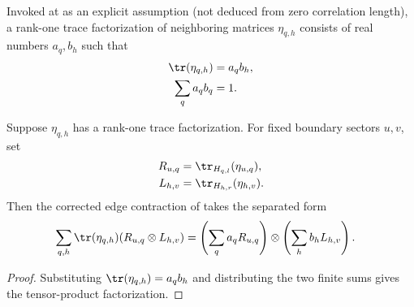 \begin{definition}
    \label{def:mpdo_generic_eta_rank_one_trace_factorization}
    \leanok
    Invoked at \cite[Appendix~C.2, line~1613]{Cirac2016MPDO_arXiv} as an
    explicit assumption (not deduced from zero correlation length), a
    rank-one trace factorization of neighboring matrices $\eta_{q,h}$
    consists of real numbers $a_q,b_h$ such that
    \begin{align}
        \tr(\eta_{q,h}) & =a_qb_h,
        \notag                     \\
        \sum_q a_qb_q   & =1.
        \notag
    \end{align}
\end{definition}

\begin{lemma}
    \label{lem:mpdo_eta_two_boundary_contraction_separated}
    \leanok
    Suppose $\eta_{q,h}$ has a rank-one trace factorization. For fixed
    boundary sectors $u,v$, set
    \begin{align}
        R_{u,q} & =\tr_{H_{q,l}}(\eta_{u,q}),
        \notag                                \\
        L_{h,v} & =\tr_{H_{h,r}}(\eta_{h,v}).
        \notag
    \end{align}
    Then the corrected edge contraction of
    \cite[Appendix~C.2, lines~1613--1617]{Cirac2016MPDO_arXiv} takes the
    separated form
    \begin{align}
        \sum_{q,h}\tr(\eta_{q,h})(R_{u,q}\otimes L_{h,v})
         & =
        \left(\sum_q a_qR_{u,q}\right)\otimes
        \left(\sum_h b_hL_{h,v}\right).
        \notag
    \end{align}
\end{lemma}

\begin{proof}\leanok
    Substituting $\tr(\eta_{q,h})=a_qb_h$ and distributing the two finite sums
    gives the tensor-product factorization.
\end{proof}

